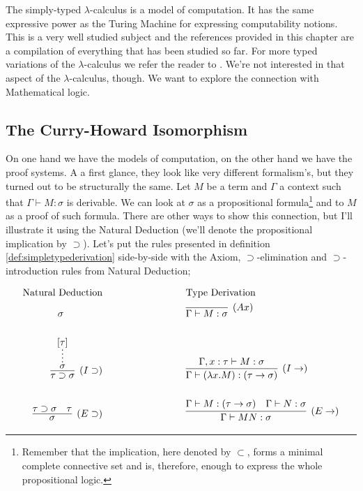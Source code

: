 The simply-typed $\lambda$-calculus is a model of computation. It has the same expressive power as
the Turing Machine for expressing computability notions. This is a very well studied subject
and the references provided in this chapter are a compilation of everything that
has been studied so far. For more typed variations of the $\lambda$-calculus we refer the reader
to \cite{Barendregt03}. We're not interested in that aspect of the $\lambda$-calculus, 
though. We want to explore the connection with Mathematical logic.

\subsection{The Curry-Howard Isomorphism}
\label{sec:background:curryhoward}

On one hand we have the models of computation, on the other hand we have the proof systems.
A a first glance, they look like very different formalism's, but they turned out to be
structurally the same. Let $M$ be a term and $\Gamma$ a context such that
$\Gamma \vdash M : \sigma$ is derivable. We can look at $\sigma$ as a propositional formula\footnote{
Remember that the implication, here denoted by $\subset$, forms a minimal complete connective set
and is, therefore, enough to express the whole propositional logic.
} and to $M$ as a proof of such formula. There are other ways to show this connection,
but I'll illustrate it using the Natural Deduction\cite{Prawitz01} (we'll denote the
propositional implication by $\supset$). Let's put the rules presented in definition
\ref{def:simpletypederivation} side-by-side with the Axiom, $\supset$-elimination and
$\supset$-introduction rules from Natural Deduction;

\begin{center}
\begin{align*}
	\text{Natural Deduction} & \hspace{3cm} \text{Type Derivation} \\
	\sigma \hspace{1.4cm} & \hspace{3cm} \infer[(Ax)]{\Gamma \vdash M : \sigma}{}  \\[0.5cm]
	\infer[(I\supset)]{\tau \supset \sigma}{\infer*{\sigma}{[\tau]}}
		& \hspace{3cm} 
		\infer[(I\rightarrow)]{\Gamma \vdash (\lambda x . M) : (\tau \rightarrow \sigma)}
							  {\Gamma, x:\tau \vdash M : \sigma} \\[0.5cm]					  
	\infer[(E\supset)]{\sigma}{\tau \supset \sigma & \tau}
		& \hspace{3cm}
		\infer[(E\rightarrow)]{\Gamma \vdash MN : \sigma}
			{ \Gamma \vdash M : (\tau \rightarrow \sigma) & \Gamma \vdash N : \sigma}
\end{align*} 
\end{center}

